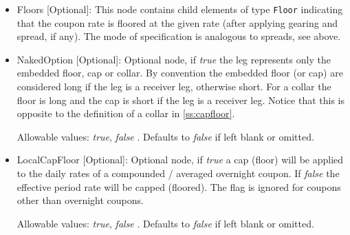 \begin{itemize}
\item Floors [Optional]: This node contains child elements of type \lstinline!Floor! indicating that the coupon rate is floored at
  the given rate (after applying gearing and spread, if any). The mode of specification is analogous to spreads, see
  above.

\item NakedOption [Optional]: Optional node, if \emph{true} the leg represents only the embedded floor, cap or collar.
  By convention the embedded floor (or cap) are considered long if the leg is a receiver leg, otherwise short. For a
  collar the floor is long and the cap is short if the leg is a receiver leg. Notice that this is opposite to
  the definition of a collar in \ref{ss:capfloor}.

 Allowable values: \emph{true}, \emph{false} . Defaults to \emph{false} if left blank or omitted.

\item LocalCapFloor [Optional]: Optional node, if \emph{true} a cap (floor) will be applied to the daily rates of a
  compounded / averaged overnight coupon. If \emph{false} the effective period rate will be capped (floored). The flag
  is ignored for coupons other than overnight coupons.

 Allowable values: \emph{true}, \emph{false} . Defaults to \emph{false} if left blank or omitted.

\end{itemize}
